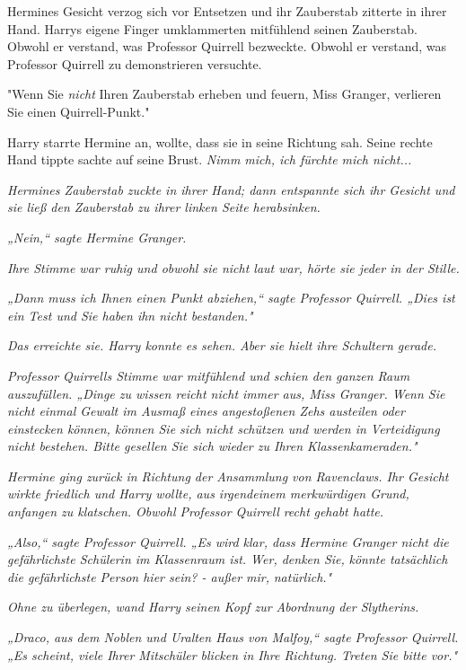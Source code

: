 {Hermines Gesicht verzog sich vor Entsetzen und ihr Zauberstab zitterte in ihrer Hand. Harrys eigene Finger umklammerten mitfühlend seinen Zauberstab. Obwohl er verstand, was Professor Quirrell bezweckte. Obwohl er verstand, was Professor Quirrell zu demonstrieren versuchte.

"Wenn Sie \emph{nicht} Ihren Zauberstab erheben und feuern, Miss Granger, verlieren Sie einen Quirrell-Punkt."

Harry starrte Hermine an, wollte, dass sie in seine Richtung sah. Seine rechte Hand tippte sachte auf seine Brust. \emph{Nimm mich, ich fürchte mich nicht...}

\emph{Hermines Zauberstab zuckte in ihrer Hand; dann entspannte sich ihr Gesicht und sie ließ den Zauberstab zu ihrer linken Seite herabsinken.}

\emph{„Nein,“ sagte Hermine Granger.}

\emph{Ihre Stimme war ruhig und obwohl sie nicht laut war, hörte sie jeder in der Stille.}

\emph{„Dann muss ich Ihnen einen Punkt abziehen,“ sagte Professor Quirrell. „Dies ist ein Test und Sie haben ihn nicht bestanden."}

\emph{Das erreichte sie. Harry konnte es sehen. Aber sie hielt ihre Schultern gerade.}

\emph{Professor Quirrells Stimme war mitfühlend und schien den ganzen Raum auszufüllen. „Dinge zu wissen reicht nicht immer aus, Miss Granger. Wenn Sie nicht einmal Gewalt im Ausmaß eines angestoßenen Zehs austeilen oder einstecken können, können Sie sich nicht schützen und werden in Verteidigung nicht bestehen. Bitte gesellen Sie sich wieder zu Ihren Klassenkameraden."}

\emph{Hermine ging zurück in Richtung der Ansammlung von Ravenclaws. Ihr Gesicht wirkte friedlich und Harry wollte, aus irgendeinem merkwürdigen Grund, anfangen zu klatschen. Obwohl Professor Quirrell} \emph{\emph{recht}} \emph{gehabt hatte.}

\emph{„Also,“ sagte Professor Quirrell. „Es wird klar, dass Hermine Granger nicht die gefährlichste Schülerin im Klassenraum ist. Wer, denken Sie,} \emph{könnte tatsächlich die gefährlichste Person hier sein? - außer mir,} \emph{natürlich."}

\emph{Ohne zu überlegen, wand Harry seinen Kopf zur Abordnung der Slytherins.}

\emph{„Draco, aus dem Noblen und Uralten Haus von Malfoy,“ sagte Professor Quirrell. „Es scheint, viele Ihrer Mitschüler blicken in Ihre Richtung. Treten Sie bitte vor."}

}
